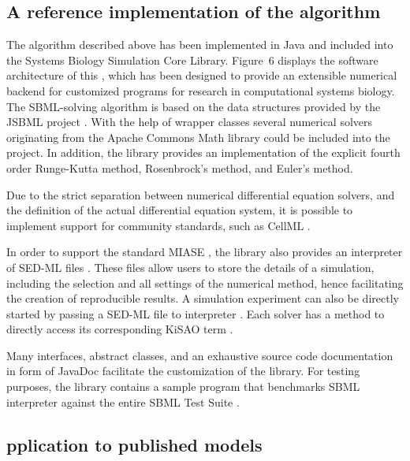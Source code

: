 \documentclass[10pt]{bmc_article}
\newenvironment{bmcformat}{\begin{raggedright}\baselineskip20pt\sloppy\setboolean{publ}{false}}{\end{raggedright}\baselineskip20pt\sloppy}
\begin{document}
\begin{bmcformat}
\subsection*{A reference implementation of the algorithm}

The algorithm described above has been implemented in Java\texttrademark{} and
included into the Systems Biology Simulation Core Library.
Figure~6 displays  the software architecture of this
, which has been designed 
to provide an extensible numerical backend for customized programs for research
in computational systems biology.
The \acs{SBML}-solving algorithm is based on the data structures provided by the
JSBML project \cite{Draeger2008}.
With the help of wrapper classes several numerical solvers originating from the
Apache Commons Math library  could be included
into the project.
In addition, the library provides an implementation of the explicit fourth order
Runge-Kutta method, Rosenbrock's method, and Euler's method.

Due to the strict separation between numerical differential equation solvers,
and the definition of the actual differential equation system, it is possible to
implement support for  community standards, such as CellML
\cite{Lloyd2004}.

In order to support the standard \acf{MIASE} \cite{Waltemath2011a}, the library also provides an interpreter of \acf{SED-ML} files \cite{Waltemath2011}.
These files allow users to store the details of a simulation, including the
selection and all settings of the numerical method, hence facilitating the
creation of reproducible results.
A simulation experiment can also be directly started by passing a \acs{SED-ML}
file to  interpreter .
Each solver has a method to directly access its corresponding \acf{KiSAO} term
\cite{Courtot2011} .

Many interfaces, abstract classes, and an exhaustive source code documentation
in  form of JavaDoc facilitate the customization of the library.
For testing purposes, the library contains a sample program that benchmarks
 \acs{SBML} interpreter against the entire SBML Test Suite
  .

\subsection*{pplication to published models}


\end{bmcformat}
\end{document}
